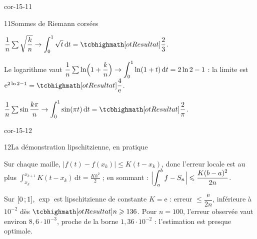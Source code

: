\begin{blocLivre}{cor-15-11}
\begin{corrige}{11}{Sommes de Riemann corsées}
\begin{questions}
  \item $\dfrac1n\sum\sqrt{\dfrac kn}\to
    \displaystyle\int_{0}^{1}\sqrt t\,\mathrm{d}t=\res{\dfrac23}$.
  \item Le logarithme vaut
    $\dfrac1n\sum\ln\Bigl(1+\dfrac kn\Bigr)\to
    \displaystyle\int_{0}^{1}\ln(1+t)\,\mathrm{d}t=2\ln2-1$ : la limite
    est $\mathrm{e}^{2\ln2-1}=\res{\dfrac4{\mathrm{e}}}$.
  \item $\dfrac1n\sum\sin\dfrac{k\pi}{n}\to
    \displaystyle\int_{0}^{1}\sin(\pi t)\,\mathrm{d}t=\res{\dfrac2\pi}$.
\end{questions}
\end{corrige}
\end{blocLivre}

\begin{blocLivre}{cor-15-12}
\begin{corrige}{12}{La démonstration lipschitzienne, en pratique}
\begin{questions}
  \item Sur chaque maille,
    $|f(t)-f(x_k)|\leqslant K(t-x_k)$, donc l'erreur locale est au plus
    $\displaystyle\int_{x_k}^{x_{k+1}}K(t-x_k)\,\mathrm{d}t=\frac{Kh^{2}}{2}$ ;
    en sommant : $\Bigl|\displaystyle\int_{a}^{b}f-S_n\Bigr|
    \leqslant\dfrac{K(b-a)^{2}}{2n}$.
  \item Sur $\mathopen{[}0\,{;}\,1\mathclose{]}$, $\exp$ est lipschitzienne de constante
    $K=\mathrm{e}$ : erreur $\leqslant\dfrac{\mathrm{e}}{2n}$, inférieure
    à $10^{-2}$ dès $\res{n\geqslant136}$. Pour $n=100$, l'erreur
    observée vaut environ $8{,}6\cdot10^{-3}$, proche de la borne
    $1{,}36\cdot10^{-2}$ : l'estimation est presque optimale.
\end{questions}
\end{corrige}
\end{blocLivre}

